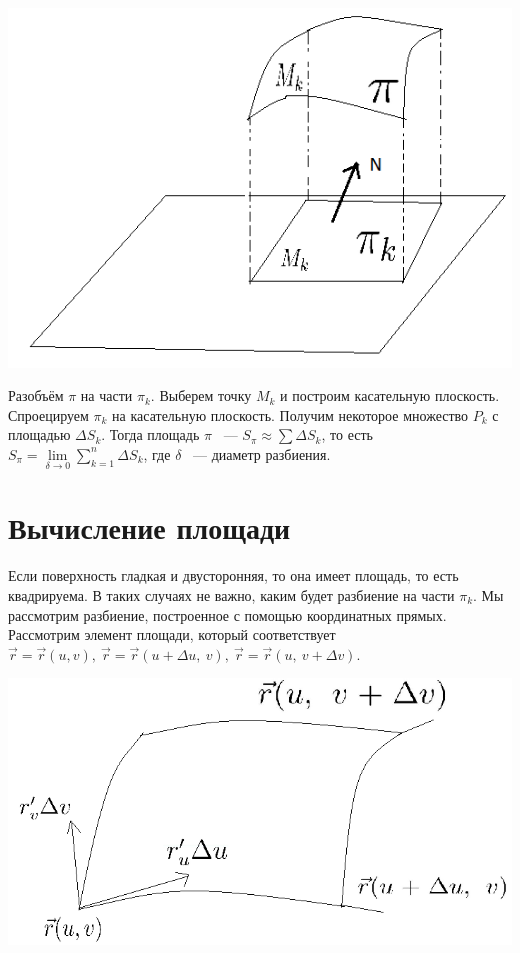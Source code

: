 \documentclass[../../main.tex]{subfiles}
\begin{document}
\begin{center}
\includegraphics[scale = 1]{lec22_1.png}
\end{center}

Разобъём $\pi$ на части $\pi_k$. Выберем точку $M_k$ и построим касательную 
плоскость. Спроецируем $\pi_k$ на касательную плоскость. Получим некоторое 
множество $P_k$ с площадью $\Delta S_k$. Тогда площадь $\pi$ ~--- $S_\pi 
\approx \sum\Delta S_k$, то есть $S_\pi = 
\lim\limits_{\delta\rightarrow0}\sum\limits_{k = 1}^n\Delta S_k$, где $\delta$ 
~--- диаметр разбиения.

\section{Вычисление площади}

Если поверхность гладкая и двусторонняя, то она имеет площадь, то есть 
квадрируема. В таких случаях не важно, каким будет разбиение на части $\pi_k$. 
Мы рассмотрим разбиение, построенное с помощью координатных прямых. Рассмотрим 
элемент площади, который соответствует $\vec{r} = \vec{r}(u, v), \ \vec{r} = 
\vec{r}(u + \Delta u, \ v), \ \vec{r} = \vec{r}(u, \ v + \Delta v)$.

\begin{center}
\includegraphics[scale = 1]{lec22_2.png}
\end{center}
\end{document}
